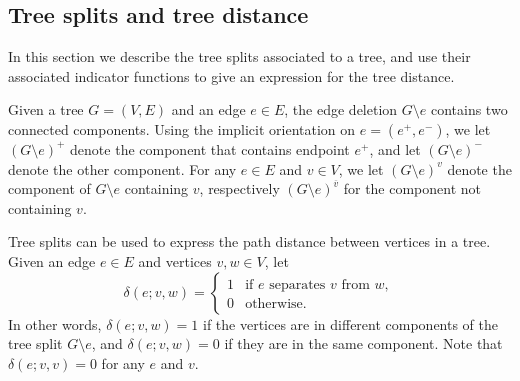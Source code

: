 \documentclass{amsart}
\theoremstyle{definition}
\begin{document}
\subsection{Tree splits and tree distance}
\label{sec:tree-splits}

In this section we describe the tree splits associated to a tree, and use their associated indicator functions to give an expression for the tree distance.

Given a tree $G = (V,E)$ and an edge $e \in E$, the edge deletion $G \setminus e$ contains two connected components.
Using the implicit orientation on $e = (e^+,e^-)$,
we let $(G \setminus e)^+$ denote the component that contains endpoint $e^+$, and let $(G\setminus e)^-$ denote the other component.
For any $e \in E$ and $v \in V$,
we let
$(G \setminus e)^{v}$ denote the component of $G\setminus e$ containing $v$,
respectively $(G\setminus e)^{\overline v}$ for the component not containing $v$.


Tree splits can be used to express the path distance between vertices in a tree.
Given an edge $e\in E$ and vertices $v,w \in V$, let 
\begin{equation}
\delta(e;v,w) = \begin{cases}
	1 &\text{if $e$ separates  $v$ from $w$}, \\
	0 &\text{otherwise}.
\end{cases}
\end{equation}
In other words, $\delta(e; v,w) = 1$ if the vertices are in different components of the tree split $G \setminus e$,
and $\delta(e; v,w) = 0$ if they are in the same component.
Note that $\delta(e; v,v) = 0$ for any $e$ and $v$.
\end{document}
